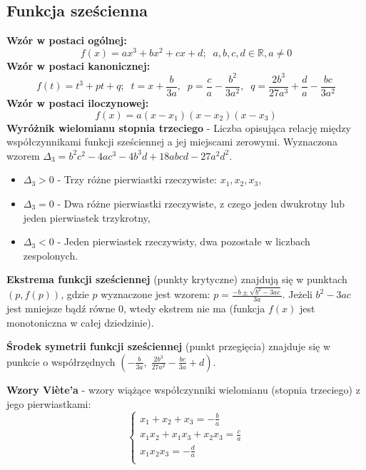 \documentclass[14pt,a4paper]{extarticle}
\begin{document}
\subsection{Funkcja sześcienna}
\noindent\textbf{Wzór w postaci ogólnej:}
$$f(x) = ax^{3} + bx^{2} + cx + d;\;\; a, b, c, d \in \mathbb{R}, a \neq 0$$
\noindent\textbf{Wzór w postaci kanonicznej:}
$$f(t) = t^{3} + pt + q;\;\; t = x + \frac{b}{3a}, \;\;p = \frac{c}{a}-\frac{b^{2}}{3a^{2}},\;\; q = \frac{2b^{3}}{27a^{3}}+\frac{d}{a}-\frac{bc}{3a^{2}}$$
\noindent\textbf{Wzór w postaci iloczynowej:}
$$f(x) = a(x - x_{1})(x - x_{2})(x - x_{3})$$
\noindent\textbf{Wyróżnik wielomianu stopnia trzeciego} - Liczba opisująca relację między współczynnikami funkcji 
sześciennej a jej miejscami zerowymi. Wyznaczona wzorem $\Delta_{3} = b^{2}c^{2} - 4ac^{3} - 4b^{3}d + 18abcd - 27a^{2}d^{2}$.


\begin{itemize}
   \item $\Delta_{3} > 0$ - Trzy różne pierwiastki rzeczywiste: $x_{1}, x_{2}, x_{3}$,
   \item $\Delta_{3} = 0$ - Dwa różne pierwiastki rzeczywiste, z czego jeden dwukrotny lub jeden pierwiastek trzykrotny,
   \item $\Delta_{3} < 0$ - Jeden pierwiastek rzeczywisty, dwa pozostałe w liczbach zespolonych.
\end{itemize}

\noindent\textbf{Ekstrema funkcji sześciennej} (punkty krytyczne) znajdują się w punktach $(p, f(p))$, gdzie $p$ wyznaczone
jest wzorem: $p = \frac{-b \pm \sqrt{b^{2} - 3ac}}{3a}$. Jeżeli $b^{2} - 3ac$ jest
mniejsze bądź równe 0, wtedy ekstrem nie ma (funkcja $f(x)$ jest monotoniczna w całej dziedzinie).\hfill\break

\noindent\textbf{Środek symetrii funkcji sześciennej} (punkt przegięcia) znajduje się w punkcie o współrzędnych 
$\left(-\frac{b}{3a}, \;\frac{2b^{3}}{27a^{2}} - \frac{bc}{3a} + d\right)$.\hfill\break

\noindent\textbf{Wzory Viète'a} - wzory wiążące współczynniki wielomianu (stopnia trzeciego) z jego pierwiastkami:\hfill\break
\begin{equation*}
   \left\{
      \begin{array}{ll}
         \!\!\!\!x_{1} + x_{2} + x_{3} = -\frac{\displaystyle b}{\displaystyle a}\\
         \!\!\!\!x_{1}x_{2} + x_{1}x_{3} + x_{2}x_{3} = \frac{\displaystyle c}{\displaystyle a}\\
         \!\!\!\!x_{1}x_{2}x_{3} = -\frac{\displaystyle d}{\displaystyle a}\\
      \end{array}
   \right.
\end{equation*}\hfill\break
\end{document}
